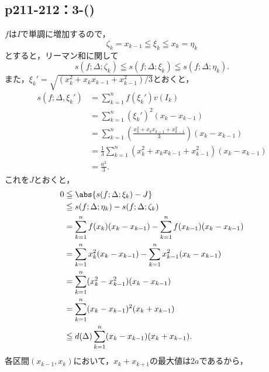 \documentclass[a4paper,10pt,fleqn]{ltjsarticle}
\begin{document}
\subsection*{p211-212：3-()}
\begin{tleftbar}
    $f$は$I$で単調に増加するので，
    \[
        \zeta_k = x_{k-1} \leqq \xi_k \leqq x_k=\eta_k
    \]
    とすると，リーマン和に関して
    \[
        s(f;\Delta ; \zeta_k ) \leqq s(f;\Delta;\xi_k) \leqq s(f;\Delta;\eta_k).
    \]
    また，$\xi_k' = \sqrt{(x_k ^2 + x_k x_{k-1}+x_{k-1} ^2)/3} $とおくと，
    \begin{align*}
        s(f;\Delta,\xi_k' ) & = \sum_{k=1}^{n} f(\xi_k') v(I_k)                                                         \\
                            & = \sum_{k=1}^{n} (\xi_k')^2 (x_k - x_{k-1})                                               \\
                            & = \sum_{k=1}^{n} \left( \frac{x_k^2 + x_k x_{k-1} + x_{k-1}^2}{3} \right) (x_k - x_{k-1}) \\
                            & = \frac{1}{3} \sum_{k=1}^{n} (x_k^2 + x_k x_{k-1} + x_{k-1}^2) (x_k - x_{k-1})            \\
                            & = \frac{a^3}{3}.
    \end{align*}
    これを$J$とおくと，
    \begin{align*}
        0 & \leqq \abs{ s(f;\Delta; \xi_k) - J }                                                \\
          & \leqq s(f;\Delta;\eta_k) - s(f;\Delta ; \zeta_k )                                   \\
          & = \sum_{k=1}^{n} f(x_k) (x_k - x_{k-1}) - \sum_{k=1}^{n} f(x_{k-1}) (x_k - x_{k-1}) \\
          & = \sum_{k=1}^{n} x_k^2 (x_k - x_{k-1}) - \sum_{k=1}^{n} x_{k-1}^2 (x_k - x_{k-1})   \\
          & = \sum_{k=1}^{n} (x_k^2 - x_{k-1}^2) (x_k - x_{k-1})                                \\
          & = \sum_{k=1}^{n} (x_k - x_{k-1})^2 (x_k + x_{k-1})                                  \\
          & \leqq d(\Delta) \sum_{k=1}^{n} (x_k - x_{k-1}) (x_k + x_{k-1}).
    \end{align*}
    各区間$(x_{k-1},x_k)$において，$x_k + x_{k+1}$の最大値は$2a$であるから，

\end{tleftbar}
\end{document}
